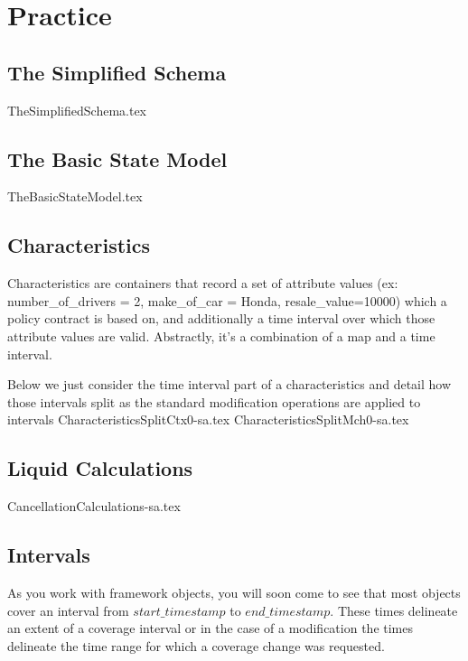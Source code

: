 \chapter{Practice}
\label{intro:03} %

\abstract{
}

\section{The Simplified Schema}
\label{sec:03:1}
{TheSimplifiedSchema.tex}

\section{The Basic State Model}
\label{sec:01:2}
{TheBasicStateModel.tex}

\section{Characteristics}
\label{sec:03:3}

Characteristics are containers that record a set of attribute values
(ex: number\_of\_drivers = 2, make\_of\_car = Honda, resale\_value=10000)
which a policy contract is based on, and additionally a time interval over which
those attribute values are valid. Abstractly, it's a combination of a map and a time
interval. 

Below we just consider the time interval part of a characteristics and detail
how those intervals split as the standard modification operations are applied
to intervals
{CharacteristicsSplitCtx0-sa.tex}
{CharacteristicsSplitMch0-sa.tex}

\section{Liquid Calculations}
\label{sec:03:4}

{CancellationCalculations-sa.tex}

\section{Intervals}
As you work with framework objects, you will soon come to see that most objects cover
an interval from $start\_timestamp$ to $end\_timestamp$. These times delineate an extent of
a coverage interval or in the case of a modification the times delineate the time range for
which a coverage change was requested.

